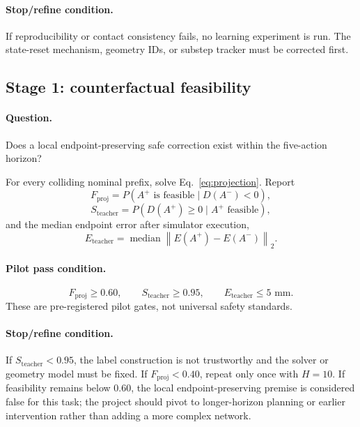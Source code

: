 \documentclass[10pt,conference]{IEEEtran}
\newcommand{\1}{\mathbf{1}}
\newcommand{\norm}[1]{\left\lVert #1 \right\rVert}
\begin{document}
\paragraph{Stop/refine condition.} If reproducibility or contact consistency fails, no learning experiment is run. The state-reset mechanism, geometry IDs, or substep tracker must be corrected first.

\subsection{Stage 1: counterfactual feasibility}

\paragraph{Question.} Does a local endpoint-preserving safe correction exist within the five-action horizon?

For every colliding nominal prefix, solve Eq.~\eqref{eq:projection}. Report
\begin{equation}
    F_{\mathrm{proj}}
    =P(A^+\text{ is feasible}\mid D(A^-)<0),
    \label{eq:fproj}
\end{equation}
\begin{equation}
    S_{\mathrm{teacher}}
    =P(D(A^+)\geq 0\mid A^+\text{ feasible}),
    \label{eq:teachersafe}
\end{equation}
and the median endpoint error after simulator execution,
\begin{equation}
    E_{\mathrm{teacher}}
    =\operatorname{median}\norm{E(A^+)-E(A^-)}_2.
    \label{eq:teacherend}
\end{equation}

\paragraph{Pilot pass condition.}
\begin{equation}
    F_{\mathrm{proj}}\geq 0.60,
    \qquad
    S_{\mathrm{teacher}}\geq 0.95,
    \qquad
    E_{\mathrm{teacher}}\leq 5\text{ mm}.
\end{equation}
These are pre-registered pilot gates, not universal safety standards.

\paragraph{Stop/refine condition.}
If $S_{\mathrm{teacher}}<0.95$, the label construction is not trustworthy and the solver or geometry model must be fixed. If $F_{\mathrm{proj}}<0.40$, repeat only once with $H=10$. If feasibility remains below $0.60$, the local endpoint-preserving premise is considered false for this task; the project should pivot to longer-horizon planning or earlier intervention rather than adding a more complex network.
\end{document}
